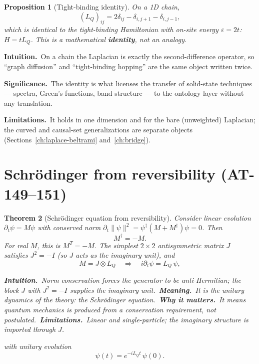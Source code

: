 \documentclass[10pt,twoside,openany]{book}
\newtheorem{theorem}{Theorem}[chapter]
\newtheorem{proposition}[theorem]{Proposition}
\newcommand{\theoremnotes}[3]{%
  \par\medskip\noindent
  \textbf{Intuition.}\ #1\par
  \textbf{Significance.}\ #2\par
  \textbf{Limitations.}\ #3\par}
\newcommand{\eqnotes}[4]{%
  \par\smallskip\noindent
  \textbf{Intuition.}\ #1\ 
  \textbf{Meaning.}\ #2\ 
  \textbf{Why it matters.}\ #3\ 
  \textbf{Limitations.}\ #4\par}
\begin{document}
\begin{proposition}[Tight-binding identity]
On a 1D chain,
\begin{equation}
(L_Q)_{ij} = 2\delta_{ij} - \delta_{i,j+1} - \delta_{i,j-1},
\end{equation}
which is \emph{identical} to the tight-binding Hamiltonian with on-site energy
$\varepsilon=2t$: $H = t L_Q$. This is a mathematical \textbf{identity}, not an analogy.
\end{proposition}

\theoremnotes
{On a chain the Laplacian is exactly the second-difference operator, so ``graph diffusion''
and ``tight-binding hopping'' are the same object written twice.}
{The identity is what licenses the transfer of solid-state techniques --- spectra,
Green's functions, band structure --- to the ontology layer without any translation.}
{It holds in one dimension and for the bare (unweighted) Laplacian; the curved and
causal-set generalizations are separate objects (Sections~\ref{ch:laplace-beltrami}
and~\ref{ch:bridge}).}

\section{Schr\"odinger from reversibility (AT-149--151)}

\begin{theorem}[Schr\"odinger equation from reversibility]
Consider linear evolution $\partial_t\psi = M\psi$ with conserved norm
$\partial_t\|\psi\|^2 = \psi^\dagger(M+M^\dagger)\psi = 0$. Then
\begin{equation}
M^\dagger = -M .
\end{equation}
For real $M$, this is $M^T=-M$. The simplest $2\times2$ antisymmetric matrix $J$ satisfies
$J^2=-I$ (so $J$ acts as the imaginary unit), and
\begin{equation}
M = J\otimes L_Q \quad\Longrightarrow\quad i\partial_t \psi = L_Q\,\psi,
\end{equation}

\eqnotes
{Norm conservation forces the generator to be anti-Hermitian; the block $J$ with $J^2=-I$
supplies the imaginary unit.}
{It is the unitary dynamics of the theory: the Schr\"odinger equation.}
{It means quantum mechanics is \emph{produced} from a conservation requirement, not
postulated.}
{Linear and single-particle; the imaginary structure is imported through $J$.}
with unitary evolution
\begin{equation}
\psi(t) = e^{-iL_Qt}\,\psi(0).
\end{equation}
\end{theorem}
\end{document}
